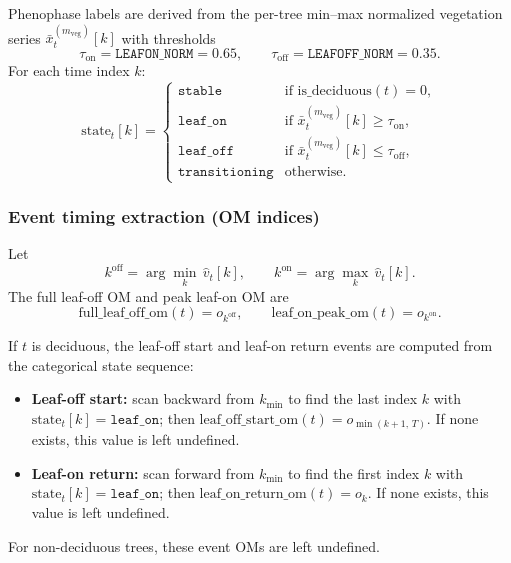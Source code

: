 \documentclass{article}
\begin{document}
Phenophase labels are derived from the per-tree min--max normalized vegetation series
$\bar{x}^{(m_\mathrm{veg})}_t[k]$ with thresholds
\begin{equation}
\tau_{\mathrm{on}}=\texttt{LEAFON\_NORM}=0.65,\qquad
\tau_{\mathrm{off}}=\texttt{LEAFOFF\_NORM}=0.35.
\end{equation}
For each time index $k$:
\begin{equation}
\mathrm{state}_{t}[k] =
\begin{cases}
\texttt{stable} & \text{if } \mathrm{is\_deciduous}(t)=0,\\
\texttt{leaf\_on} & \text{if } \bar{x}^{(m_\mathrm{veg})}_t[k]\ge \tau_{\mathrm{on}},\\
\texttt{leaf\_off} & \text{if } \bar{x}^{(m_\mathrm{veg})}_t[k]\le \tau_{\mathrm{off}},\\
\texttt{transitioning} & \text{otherwise.}
\end{cases}
\end{equation}

\subsubsection{Event timing extraction (OM indices)}

Let
\begin{equation}
 k^{\mathrm{off}}=\arg\min_{k} \,\hat{v}_t[k],\qquad k^{\mathrm{on}}=\arg\max_{k} \,\hat{v}_t[k].
\end{equation}
The full leaf-off OM and peak leaf-on OM are
\begin{equation}
\mathrm{full\_leaf\_off\_om}(t)=o_{k^{\mathrm{off}}},\qquad
\mathrm{leaf\_on\_peak\_om}(t)=o_{k^{\mathrm{on}}}.
\end{equation}

If $t$ is deciduous, the leaf-off start and leaf-on return events are computed from the categorical state sequence:
\begin{itemize}[leftmargin=*, itemsep=2pt]
\item \textbf{Leaf-off start:} scan backward from $k_{\min}$ to find the last index $k$ with $\mathrm{state}_t[k]=\texttt{leaf\_on}$;
then
$\mathrm{leaf\_off\_start\_om}(t)=o_{\min(k+1,\,T)}$. If none exists, this value is left undefined.
\item \textbf{Leaf-on return:} scan forward from $k_{\min}$ to find the first index $k$ with $\mathrm{state}_t[k]=\texttt{leaf\_on}$;
then
$\mathrm{leaf\_on\_return\_om}(t)=o_k$. If none exists, this value is left undefined.
\end{itemize}
For non-deciduous trees, these event OMs are left undefined.
\end{document}
